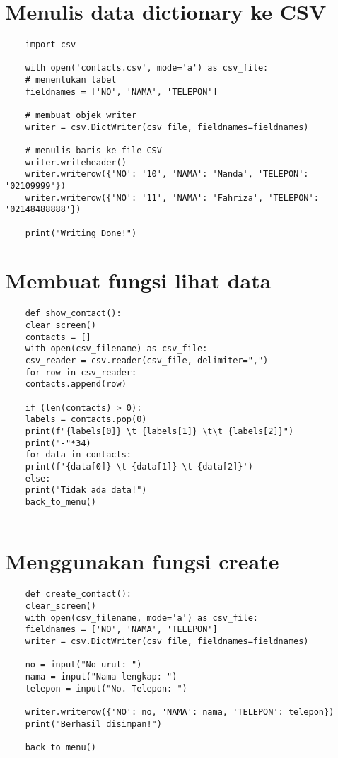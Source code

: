 \documentclass{article}
\begin{document}
\section{ Menulis data dictionary ke CSV}
\begin{lstlisting}
	import csv
	
	with open('contacts.csv', mode='a') as csv_file:
	# menentukan label
	fieldnames = ['NO', 'NAMA', 'TELEPON']
	
	# membuat objek writer
	writer = csv.DictWriter(csv_file, fieldnames=fieldnames)
	
	# menulis baris ke file CSV
	writer.writeheader()
	writer.writerow({'NO': '10', 'NAMA': 'Nanda', 'TELEPON': '02109999'})
	writer.writerow({'NO': '11', 'NAMA': 'Fahriza', 'TELEPON': '02148488888'})
	
	print("Writing Done!")
\end{lstlisting}

\section{Membuat fungsi lihat data}
\begin{lstlisting}
	def show_contact():
	clear_screen()
	contacts = []
	with open(csv_filename) as csv_file:
	csv_reader = csv.reader(csv_file, delimiter=",")
	for row in csv_reader:
	contacts.append(row)
	
	if (len(contacts) > 0):
	labels = contacts.pop(0)
	print(f"{labels[0]} \t {labels[1]} \t\t {labels[2]}")
	print("-"*34)
	for data in contacts:
	print(f'{data[0]} \t {data[1]} \t {data[2]}')
	else:
	print("Tidak ada data!")
	back_to_menu()
	
\end{lstlisting}

\section{Menggunakan fungsi create}
\begin{lstlisting}
	def create_contact():
	clear_screen()
	with open(csv_filename, mode='a') as csv_file:
	fieldnames = ['NO', 'NAMA', 'TELEPON']
	writer = csv.DictWriter(csv_file, fieldnames=fieldnames)
	
	no = input("No urut: ")
	nama = input("Nama lengkap: ")
	telepon = input("No. Telepon: ")
	
	writer.writerow({'NO': no, 'NAMA': nama, 'TELEPON': telepon})    
	print("Berhasil disimpan!")
	
	back_to_menu()
\end{lstlisting}
\end{document}

